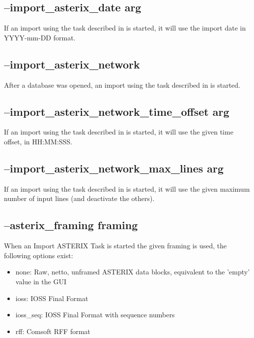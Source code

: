 \subsection{--import\_asterix\_date arg}

If an import using the task described in  is started, it will use the import date in YYYY-mm-DD format.

\subsection{--import\_asterix\_network}

After a database was opened, an import using the task described in  is started.

\subsection{--import\_asterix\_network\_time\_offset arg}

If an import using the task described in  is started, it will use the given time offset, in HH:MM:SSS.

\subsection{--import\_asterix\_network\_max\_lines arg}

If an import using the task described in  is started, it will use the given maximum number of input lines (and deactivate the others).

\subsection{--asterix\_framing framing}

When an Import ASTERIX Task is started the given framing is used, the following options exist:

\begin{itemize}
\item none:  Raw, netto, unframed ASTERIX data blocks, equivalent to the 'empty' value in the GUI
\item ioss:  IOSS Final Format
\item ioss\_seq: IOSS Final Format with sequence numbers
\item rff: Comsoft RFF format
\end{itemize}

